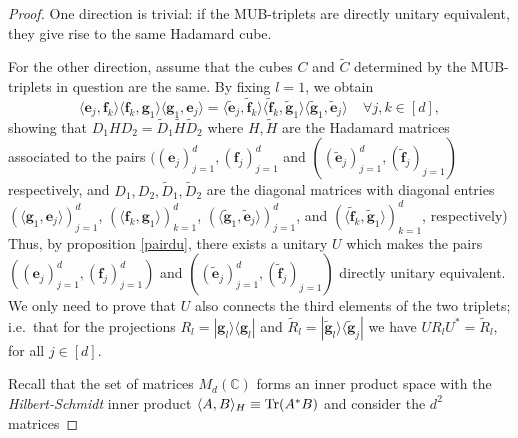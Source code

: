 \documentclass[12pt]{amsart}
\numberwithin{equation}{section}
\theoremstyle{definition}
\theoremstyle{remark}
\theoremstyle{remark}
\newcommand{\CC}{\ensuremath{\mathbb{C}}}
\newcommand{\gb}{\ensuremath{\mathbf{g}}}
\newcommand{\eb}{\ensuremath{\mathbf{e}}}
\newcommand{\fb}{\ensuremath{\mathbf{f}}}
\begin{document}
\begin{proof}
One direction is trivial: if the MUB-triplets are directly unitary equivalent, they give rise to the same Hadamard cube. 

\medskip

For the other direction, assume that the cubes $C$ and $\tilde{C}$ determined by the MUB-triplets in question are the same. By fixing $l=1$, we obtain
$$
\langle \eb_j, \fb_k\rangle 
\langle \fb_k, \gb_1\rangle
\langle \gb_1, \eb_j\rangle 
= 
\langle \tilde{\eb}_j, \tilde{\fb}_k\rangle 
\langle \tilde{\fb}_k, \tilde{\gb}_1\rangle
\langle \tilde{\gb}_1, \tilde{\eb}_j\rangle \ \ \ \ \ \forall j,k\in [d],
$$
showing that $D_1HD_2 = \tilde{D}_1\tilde{H}\tilde{D}_2$ where $H,\tilde{H}$ are the Hadamard matrices associated to the pairs $((\eb_j)_{j=1}^d,(\fb_j)_{j=1}^d$ and
$((\tilde{\eb}_j)_{j=1}^d,(\tilde{\fb}_j)_{j=1})$ respectively, and $D_1,D_2,\tilde{D}_1,\tilde{D}_2$
are the diagonal matrices with diagonal entries 
$(\langle \gb_1, \eb_j\rangle)_{j=1}^{d}$,
$(\langle \fb_k, \gb_1\rangle)_{k=1}^{d}$,
$(\langle \tilde{\gb}_1, \tilde{\eb}_j\rangle)_{j=1}^{d}$,
and 
$(\langle \tilde{\fb}_k, \tilde{\gb}_1\rangle)_{k=1}^{d}$, respectively) Thus, by proposition \ref{pairdu}, there exists a unitary $U$ which makes the pairs $((\eb_j)_{j=1}^d,(\fb_j)_{j=1}^d)$ and
$((\tilde{\eb}_j)_{j=1}^d,(\tilde{\fb}_j)_{j=1})$ directly unitary equivalent. We only need to prove that $U$ also connects the third elements of the two triplets; i.e.\ that for the projections $R_l=|\gb_l\rangle\langle\gb_l|$ and 
$\tilde{R}_l=|\tilde{\gb}_l\rangle\langle\tilde{\gb}_j|$ we have 
$UR_lU^* =\tilde{R}_l$,
for all $j\in [d]$.

Recall that the set of matrices $M_d(\CC)$ forms an inner product space with the {\it Hilbert-Schmidt} inner product $\langle A,B\rangle_{H}\equiv {\rm Tr}(A^*B)$ and consider the $d^2$ matrices 


\end{proof}
\end{document}
